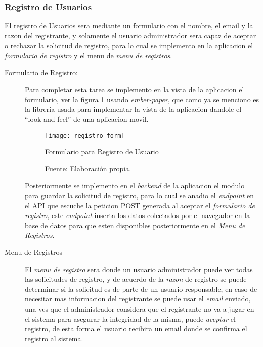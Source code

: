 \subsubsection{Registro de Usuarios}

El registro de Usuarios sera mediante un formulario con el nombre, el email y la razon del registrante, y solamente el usuario administrador sera capaz de aceptar o rechazar la solicitud de registro, para lo cual se implemento en la aplicacion el \emph{formulario de registro} y el menu de \emph{menu de registros}. \\



\begin{description}
  \item[Formulario de Registro:] Para completar esta tarea se implemento en la vista de la aplicacion el formulario, ver la figura \ref{fig:registro_form} usando \emph{ember-paper}, que como ya se menciono es la libreria usada para implementar la vista de la aplicacion dandole el ``look and feel'' de una aplicacion movil. \\

  \begin{figure}[H]
        \begin{center}
          \texttt{[image: registro\_form]}

          \caption{Formulario para Registro de Usuario}
          \label{fig:registro_form}
          \caption*{Fuente: Elaboración propia.}
        \end{center}
  \end{figure}


  Posteriormente se implemento en el \emph{backend} de la aplicacion el modulo para guardar la solicitud de registro, para lo cual se  anadio el \emph{endpoint} en el API que escuche la peticion POST generada al aceptar el \emph{formulario de registro}, este \emph{endpoint} inserta los datos colectados por el navegador en la base de datos para que esten disponibles posteriormente en el \emph{Menu de Registros}.\\


  \item[Menu de Registros] El \emph{menu de registro} sera donde un usuario administrador puede ver todas las solicitudes de registro, y de acuerdo de la \emph{razon} de registro se puede determinar si la solicitud es de parte de un usuario responsable, en caso de necesitar mas informacion del registrante se puede usar el \emph{email} enviado, una ves que el administrador considera que el registrante no va a jugar en el sistema para asegurar la integridad de la misma, puede \emph{aceptar} el registro, de esta forma el usuario recibira un email donde se confirma el registro al sistema.\\





\end{description}


